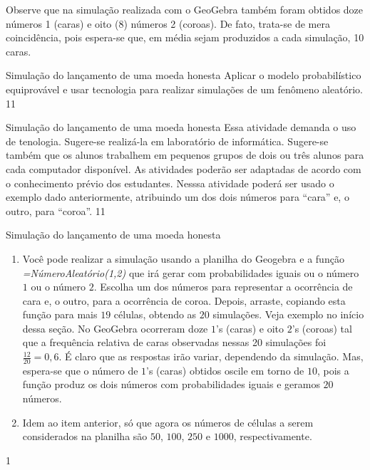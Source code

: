 Observe que na simulação realizada com o GeoGebra também foram obtidos doze números 1 (caras) e oito (8) números 2 (coroas). De fato, trata-se de mera coincidência, pois espera-se que, em média sejam produzidos a cada simulação, 10 caras.
\clearmargin
\begin{objectives}{Simulação do lançamento de uma moeda honesta}
{
Aplicar o modelo probabilístico equiprovável e usar tecnologia para realizar simulações de um fenômeno aleatório.
}{1}{1}
\end{objectives}
\begin{sugestions}{Simulação do lançamento de uma moeda honesta}
{
Essa atividade demanda o uso de tenologia. Sugere-se realizá-la em laboratório de informática. Sugere-se também que os alunos trabalhem em pequenos grupos de dois ou três alunos para cada computador disponível. As atividades poderão ser adaptadas de acordo com o conhecimento prévio dos estudantes. Nesssa atividade poderá ser usado o exemplo dado anteriormente, atribuindo um dos dois números para “cara”{} e, o outro, para “coroa”.
}{1}{1}
\end{sugestions}
\begin{answer}{Simulação do lançamento de uma moeda honesta}
{
\begin{enumerate}
\item Você pode realizar a simulação usando a planilha do Geogebra e a função \textit{=NúmeroAleatório(1,2)} que irá gerar com probabilidades iguais ou o número $1$ ou o número $2$. Escolha um dos números para representar a ocorrência de cara e, o outro, para a ocorrência de coroa. Depois, arraste, copiando esta função para mais $19$ células, obtendo as $20$ simulações. Veja exemplo no início dessa seção. No GeoGebra ocorreram doze $1$’s (caras) e oito $2$’s (coroas) tal que a frequência relativa de caras observadas nessas 20 simulações foi $\frac{12}{20}=0{,}6$. É claro que as respostas irão variar, dependendo da simulação. Mas, espera-se que o número de $1$’s (caras) obtidos oscile em torno de $10$, pois a função produz os dois números com probabilidades iguais e geramos $20$ números.

\item Idem ao item anterior, só que agora os números de células a serem considerados na planilha são $50$, $100$, $250$ e $1000$, respectivamente.
\end{enumerate}
}{1}
\end{answer}
